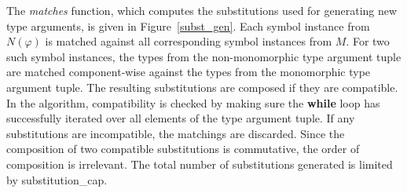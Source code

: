 \documentclass[runningheads]{llncs}
\begin{document}
The \emph{matches} function, which computes the substitutions used for generating new type arguments, is given in Figure~\ref{subst_gen}. Each symbol instance from \(N(\varphi)\) is matched against all corresponding symbol instances from \(M\).
For two such symbol instances, the types from the non-monomorphic type argument tuple are matched component-wise against the types from the monomorphic type argument tuple. The resulting substitutions are composed if they are compatible. In the algorithm, compatibility is checked by making sure the \textbf{while} loop has successfully iterated over all elements of the type argument tuple. If any substitutions are incompatible, the matchings are discarded. Since the composition of two compatible substitutions is commutative, the order of composition is irrelevant. The total number of substitutions generated is limited by \textcolor{ourblueviolet}{substitution\_cap}.

%
%
%
%
%
%         
%
%
%
%
\end{document}
